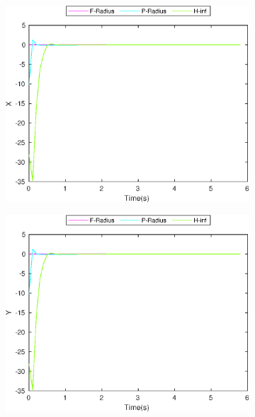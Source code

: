 \FloatBarrier
\begin{figure}[!h]
\begin{subfigure}{.5\linewidth}
\centering
\includegraphics[width=\linewidth]{figures/BoundChange/PM/pm_bound_changeX}
\end{subfigure}
\begin{subfigure}{.5\linewidth}
\centering
\includegraphics[width=\linewidth]{figures/BoundChange/PM/pm_bound_changeY}
\end{subfigure}
\begin{subfigure}{.5\linewidth}
\centering

\end{subfigure}
\end{figure}
